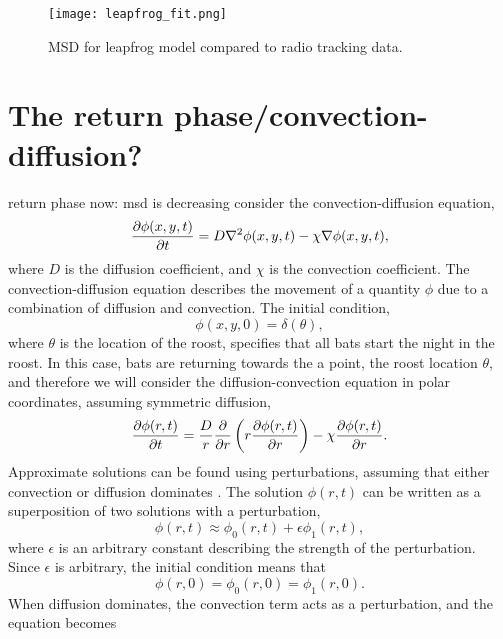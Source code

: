 \begin{figure} [h]
    \centering
        \texttt{[image: leapfrog\_fit.png]}
        \caption{MSD for leapfrog model compared to radio tracking data.
        }
    \label{fig:leapfrog_fit}
\end{figure}



\section{The return phase/convection-diffusion?}

{\huge return phase now: msd is decreasing}
 consider the convection-diffusion equation,
%
\begin{equation}
  \frac{\partial \phi(x,y,t)}{\partial t} = D\nabla^2\phi(x,y,t) - \chi \nabla\phi(x,y,t),
\end{equation}
%
where $D$ is the diffusion coefficient, and $\chi$ is the convection coefficient. The convection-diffusion equation describes the movement of a quantity $\phi$ due to a combination of diffusion and convection. The initial condition,
%
\begin{equation}
  \phi(x,y,0) = \delta(\theta),
\end{equation}
%
where $\theta$ is the location of the roost, specifies that all bats start the night in the roost.
%
In this case, bats are returning towards the a point, the roost location $\theta$, and therefore we will consider the diffusion-convection equation in polar coordinates, assuming symmetric diffusion,
%
\begin{equation}
  \frac{\partial \phi(r,t)}{\partial t} = \frac{D}{r} \frac{\partial }{\partial r}\left(r \frac{\partial \phi(r,t)}{\partial r} \right) - \chi \frac{\partial \phi(r,t)}{\partial r}.
\end{equation}
%
Approximate solutions can be found using perturbations, assuming that either convection or diffusion dominates \cite{hinchperturbation}. The solution $\phi(r,t)$ can be written as a superposition of two solutions with a perturbation,
%
\begin{equation}
  \phi(r,t) \approx \phi_0(r,t) + \epsilon \phi_1(r,t),
  \label{eqn:phi_perturbation}
\end{equation}
%
where $\epsilon$ is an arbitrary constant describing the strength of the perturbation. Since $\epsilon$ is arbitrary, the initial condition means that
%
\begin{equation}
  \phi(r,0) = \phi_0(r,0) = \phi_1(r,0).
\end{equation}
%
When diffusion dominates, the convection term acts as a perturbation, and the equation becomes
